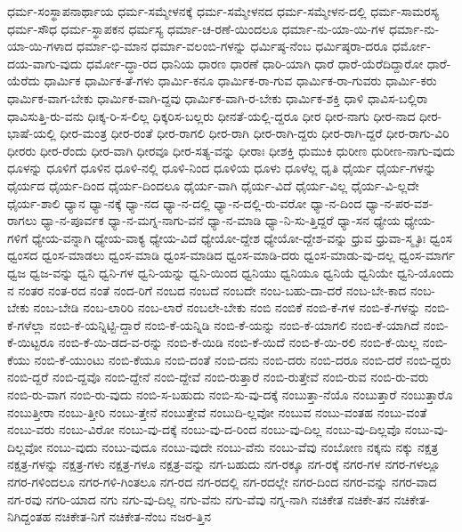 {ಧರ್ಮ-ಸಂಸ್ಥಾಪನಾರ್ಥಾಯ
ಧರ್ಮ-ಸಮ್ಮೇಳನಕ್ಕೆ
ಧರ್ಮ-ಸಮ್ಮೇಳನದ
ಧರ್ಮ-ಸಮ್ಮೇಳನ-ದಲ್ಲಿ
ಧರ್ಮ-ಸಾಮರಸ್ಯ
ಧರ್ಮ-ಸೌಧ
ಧರ್ಮ-ಸ್ಥಾಪಕನ
ಧರ್ಮಸ್ಯ
ಧರ್ಮಾ-ಚ-ರಣೆ-ಯಿಂದಲೂ
ಧರ್ಮಾ-ನು-ಯಾ-ಯಿ-ಗಳ
ಧರ್ಮಾ-ನು-ಯಾ-ಯಿ-ಗಳಾದ
ಧರ್ಮಾ-ಭಿ-ಮಾನ
ಧರ್ಮಾ-ವಲಂಬಿ-ಗಳನ್ನು
ಧರ್ಮಿಷ್ಠ-ನೆಂಬ
ಧರ್ಮಿಷ್ಠರಾ-ದರೂ
ಧರ್ಮೋ-ದಯ-ವಾಗು-ವುದು
ಧರ್ಮೋ-ದ್ಧಾ-ರದ
ಧಾನಿಯ
ಧಾರಣ
ಧಾರಣೆ
ಧಾರಿ-ಯಾಗಿ
ಧಾರೆ
ಧಾರೆ-ಯೆರೆದಿದ್ದಾರೋ
ಧಾರೆ-ಯೆರೆದು
ಧಾರ್ಮಿಕ
ಧಾರ್ಮಿಕ-ತೆ-ಗಳು
ಧಾರ್ಮಿ-ಕನೂ
ಧಾರ್ಮಿಕ-ರಾ-ಗುವ
ಧಾರ್ಮಿಕ-ರಾ-ಗುವರು
ಧಾರ್ಮಿ-ಕರು
ಧಾರ್ಮಿಕ-ವಾಗ-ಬೇಕು
ಧಾರ್ಮಿಕ-ವಾಗಿ-ದ್ದವು
ಧಾರ್ಮಿಕ-ವಾಗಿ-ರ-ಬೇಕು
ಧಾರ್ಮಿಕ-ಶಕ್ತಿ
ಧಾಳಿ
ಧಾವಿಸ-ಬಲ್ಲಿರಾ
ಧಾವಿಸುತ್ತಿ-ರು-ವನು
ಧಿಃಕ್ಕ-ರಿ-ಸ-ಲಿಲ್ಲ
ಧಿಕ್ಕರಿಸ-ಬಲ್ಲರು
ಧೀನತೆ-ಯಲ್ಲಿ-ದ್ದರೂ
ಧೀರ
ಧೀರ-ನಾಗು
ಧೀರ-ನಾದ
ಧೀರ-ಭಾಷೆ-ಯಲ್ಲಿ
ಧೀರ-ಮಂತ್ರ
ಧೀರ-ರಂತೆ
ಧೀರ-ರಾಗಲಿ
ಧೀರ-ರಾಗಿ
ಧೀರ-ರಾಗಿ-ದ್ದರು
ಧೀರ-ರಾಗಿ-ದ್ದರೆ
ಧೀರ-ರಾಗು-ವಿರಿ
ಧೀರರು
ಧೀರ-ರೆಂದು
ಧೀರ-ವಾಗಿ
ಧೀರವೂ
ಧೀರ-ಸತ್ಯ-ವನ್ನು
ಧೀರಾಃ
ಧೀಶಕ್ತಿ
ಧುಮುಕಿ
ಧುರೀಣ
ಧುರೀಣ-ನಾಗು-ವುದು
ಧೂಳನ್ನು
ಧೂಳಿಗೆ
ಧೂಳಿನ
ಧೂಳಿ-ನಲ್ಲಿ
ಧೂಳಿ-ನಿಂದ
ಧೂಳಿಯ
ಧೂಳು
ಧೂಳೆಲ್ಲ
ಧೃತಿ
ಧೈರ್ಯ
ಧೈರ್ಯ-ಗಳನ್ನು
ಧೈರ್ಯದ
ಧೈರ್ಯ-ದಿಂದ
ಧೈರ್ಯ-ದಿಂದಲೂ
ಧೈರ್ಯ-ವಾಗಿ
ಧೈರ್ಯ-ವಿದೆ
ಧೈರ್ಯ-ವಿಲ್ಲ
ಧೈರ್ಯ-ವಿ-ಲ್ಲದೇ
ಧೈರ್ಯ-ಶಾಲಿ
ಧ್ಯಾನ
ಧ್ಯಾ-ನಕ್ಕೆ
ಧ್ಯಾ-ನದ
ಧ್ಯಾ-ನ-ದಲ್ಲಿ
ಧ್ಯಾ-ನ-ದಲ್ಲಿ-ರು-ವರೋ
ಧ್ಯಾ-ನ-ದಿಂದ
ಧ್ಯಾ-ನ-ಪರ-ವಶ-ರಾಗಲು
ಧ್ಯಾ-ನ-ಪೂರ್ವಕ
ಧ್ಯಾ-ನ-ಮಗ್ನ-ನಾಗು-ವನೆ
ಧ್ಯಾ-ನ-ಮಾಡಿ
ಧ್ಯಾ-ನಿ-ಸು-ತ್ತಿದ್ದರೆ
ಧ್ಯಾ-ಸನ
ಧ್ಯೇಯ
ಧ್ಯೇಯ-ಗಳಿಗೆ
ಧ್ಯೇಯ-ವನ್ನಾಗಿ
ಧ್ಯೇಯ-ವಾಕ್ಯ
ಧ್ಯೇಯ-ವಿದೆ
ಧ್ಯೇಯೋ-ದ್ದೇಶ
ಧ್ಯೇಯೋ-ದ್ದೇಶ-ವನ್ನು
ಧ್ರುವ
ಧ್ರುವಾ-ಸ್ಮೃತಿಃ
ಧ್ವಂಸ
ಧ್ವಂಸದ
ಧ್ವಂಸ-ಮಾಡಲು
ಧ್ವಂಸ-ಮಾಡಿ
ಧ್ವಂಸ-ಮಾಡಿದ
ಧ್ವಂಸ-ಮಾಡಿ-ದರು
ಧ್ವಂಸ-ಮಾಡು-ವು-ದಲ್ಲ
ಧ್ವಂಸ-ಮಾರ್ಗ
ಧ್ವಜ
ಧ್ವಜ-ವನ್ನು
ಧ್ವನಿ
ಧ್ವನಿ-ಗಳ
ಧ್ವನಿ-ಯನ್ನು
ಧ್ವನಿ-ಯಿಂದ
ಧ್ವನಿಯು
ಧ್ವನಿಯೂ
ಧ್ವನಿಯೆ
ಧ್ವನಿಯೇ
ಧ್ವನಿ-ಯೊಂದು
ನ
ನಂತರ
ನಂತ-ರದ
ನಂತೆ
ನಂದ-ರಿಗೆ
ನಂಬದ
ನಂಬದೆ
ನಂಬದೇ
ನಂಬ-ಬಹು-ದಾ-ದರೆ
ನಂಬ-ಬೇ-ಕಾದ
ನಂಬ-ಬೇಕು
ನಂಬ-ಬೇಡಿ
ನಂಬ-ಲಾರಿರಿ
ನಂಬ-ಲಾರೆ
ನಂಬಲೇ-ಬೇಕು
ನಂಬಿ
ನಂಬಿಕೆ
ನಂಬಿ-ಕೆ-ಗಳ
ನಂಬಿ-ಕೆ-ಗಳನ್ನು
ನಂಬಿ-ಕೆ-ಗಳೆಲ್ಲಾ
ನಂಬಿ-ಕೆ-ಯನ್ನಿಟ್ಟಿ-ದ್ದಾರೆ
ನಂಬಿ-ಕೆ-ಯನ್ನಿಡಿ
ನಂಬಿ-ಕೆ-ಯನ್ನು
ನಂಬಿ-ಕೆ-ಯಾಗಲಿ
ನಂಬಿ-ಕೆ-ಯಾಗಿದೆ
ನಂಬಿ-ಕೆ-ಯಿಟ್ಟರೂ
ನಂಬಿ-ಕೆ-ಯಿ-ಡದ-ವ-ರನ್ನು
ನಂಬಿ-ಕೆ-ಯಿಡಿ
ನಂಬಿ-ಕೆ-ಯಿದೆ
ನಂಬಿ-ಕೆ-ಯಿ-ರಲಿ
ನಂಬಿ-ಕೆ-ಯಿಲ್ಲ
ನಂಬಿ-ಕೆಯು
ನಂಬಿ-ಕೆ-ಯುಂಟು
ನಂಬಿ-ಕೆಯೂ
ನಂಬಿ-ದಂತೆ
ನಂಬಿ-ದನು
ನಂಬಿ-ದರು
ನಂಬಿ-ದರೂ
ನಂಬಿ-ದರೆ
ನಂಬಿ-ದ್ದರು
ನಂಬಿ-ದ್ದರೆ
ನಂಬಿ-ದ್ದವೊ
ನಂಬಿ-ದ್ದೇನೆ
ನಂಬಿ-ದ್ದೇವೆ
ನಂಬಿ-ರುತ್ತಾರೆ
ನಂಬಿ-ರುತ್ತೇವೆ
ನಂಬಿ-ರುವ
ನಂಬಿ-ರು-ವರು
ನಂಬಿ-ರು-ವಾಗ
ನಂಬಿ-ರು-ವುದು
ನಂಬಿ-ಸ-ಬಹುದು
ನಂಬಿ-ಸು-ವು-ದಕ್ಕೆ
ನಂಬುತ್ತಾ-ನೆಯೊ
ನಂಬುತ್ತಾರೆ
ನಂಬುತ್ತಾರೊ
ನಂಬುತ್ತೀರಾ
ನಂಬು-ತ್ತೀರಿ
ನಂಬು-ತ್ತೇನೆ
ನಂಬುತ್ತೇವೆ
ನಂಬುದಿ-ಲ್ಲವೋ
ನಂಬುವ
ನಂಬು-ವಂತಹ
ನಂಬು-ವಂತೆ
ನಂಬು-ವರು
ನಂಬು-ವಿರೋ
ನಂಬು-ವು-ದಕ್ಕೆ
ನಂಬು-ವು-ದ-ರಿಂದ
ನಂಬು-ವು-ದಿಲ್ಲ
ನಂಬು-ವು-ದಿಲ್ಲವೊ
ನಂಬು-ವು-ದಿಲ್ಲವೋ
ನಂಬು-ವುದು
ನಂಬು-ವುದೂ
ನಂಬು-ವುದೇ
ನಂಬು-ವೆನು
ನಂಬು-ವೆವು
ನಂಬೋಣ
ನಕ್ಕನು
ನಕ್ಕು
ನಕ್ಷತ್ರ
ನಕ್ಷತ್ರ-ಗಳನ್ನು
ನಕ್ಷತ್ರ-ಗಳು
ನಕ್ಷತ್ರ-ಗಳೂ
ನಕ್ಷತ್ರ-ವನ್ನು
ನಗ-ಬಹುದು
ನಗ-ರಕ್ಕೂ
ನಗ-ರಕ್ಕೆ
ನಗರ-ಗಳ
ನಗರ-ಗಳಲ್ಲೂ
ನಗರ-ಗಳಿಂದಲೂ
ನಗರ-ಗಳಿ-ಗಿಂತಲೂ
ನಗ-ರದ
ನಗ-ರದಲ್ಲಿ
ನಗ-ರದಲ್ಲೇ
ನಗರ-ದಿಂದ
ನಗರ-ವನ್ನು
ನಗರ-ವಾದ
ನಗ-ರವು
ನಗರಿ-ಯಾದ
ನಗು
ನಗು-ವು-ದಿಲ್ಲ
ನಗು-ವೆನು
ನಗು-ವೆವು
ನಗ್ನ-ನಾಗಿ
ನಚಿಕೇತ
ನಚಿಕೇ-ತನ
ನಚಿಕೇತ-ನಿಗಿದ್ದಂತಹ
ನಚಿಕೇತ-ನಿಗೆ
ನಚಿಕೇತ-ನೆಂಬ
ನಜರ-ತ್ತಿನ
}
